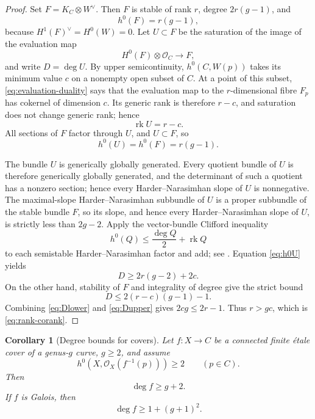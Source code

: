 \documentclass[11pt,reqno]{amsart}
\numberwithin{equation}{section}
\newtheorem{corollary}[theorem]{Corollary}
\theoremstyle{definition}
\theoremstyle{remark}
\newcommand{\OO}{\mathcal O}
\newcommand{\rk}{\operatorname{rk}}
\begin{document}
\begin{proof}
Set $F=K_C\otimes W^\vee$.  Then $F$ is stable of rank $r$, degree $2r(g-1)$, and
\[
h^0(F)=r(g-1),
\]
because $H^1(F)^\vee=H^0(W)=0$.  Let $U\subset F$ be the saturation of the image of the evaluation map
\[
H^0(F)\otimes\OO_C\longrightarrow F,
\]
and write $D=\deg U$.  By upper semicontinuity, $h^0(C,W(p))$ takes its minimum value $c$ on a nonempty open subset of $C$.  At a point of this subset, \eqref{eq:evaluation-duality} says that the evaluation map to the $r$-dimensional fibre $F_p$ has cokernel of dimension $c$.  Its generic rank is therefore $r-c$, and saturation does not change generic rank; hence
\[
\rk U=r-c.
\]
All sections of $F$ factor through $U$, and $U\subset F$, so
\begin{equation}\label{eq:h0U}
h^0(U)=h^0(F)=r(g-1).
\end{equation}

The bundle $U$ is generically globally generated.  Every quotient bundle of $U$ is therefore generically globally generated, and the determinant of such a quotient has a nonzero section; hence every Harder--Narasimhan slope of $U$ is nonnegative.  The maximal-slope Harder--Narasimhan subbundle of $U$ is a proper subbundle of the stable bundle $F$, so its slope, and hence every Harder--Narasimhan slope of $U$, is strictly less than $2g-2$.  Apply the vector-bundle Clifford inequality
\[
h^0(Q)\le\frac{\deg Q}{2}+\rk Q
\]
to each semistable Harder--Narasimhan factor and add; see \cite[Theorem~2.1]{BPGN1997}.  Equation \eqref{eq:h0U} yields
\begin{equation}\label{eq:Dlower}
D\ge2r(g-2)+2c.
\end{equation}
On the other hand, stability of $F$ and integrality of degree give the strict bound
\begin{equation}\label{eq:Dupper}
D\le2(r-c)(g-1)-1.
\end{equation}
Combining \eqref{eq:Dlower} and \eqref{eq:Dupper} gives
$2cg\le2r-1$.  Thus $r>gc$, which is \eqref{eq:rank-corank}.
\end{proof}

\begin{corollary}[Degree bounds for covers]\label{cor:degree-bounds}
Let $f:X\to C$ be a connected finite \'etale cover of a genus-$g$ curve, $g\ge2$, and assume
\[
h^0\!\left(X,\OO_X(f^{-1}(p))\right)\ge2
\qquad(p\in C).
\]
Then
\begin{equation}\label{eq:nongalois-degree}
\deg f\ge g+2.
\end{equation}
If $f$ is Galois, then
\begin{equation}\label{eq:galois-degree}
\deg f\ge1+(g+1)^2.
\end{equation}
\end{corollary}
\end{document}
